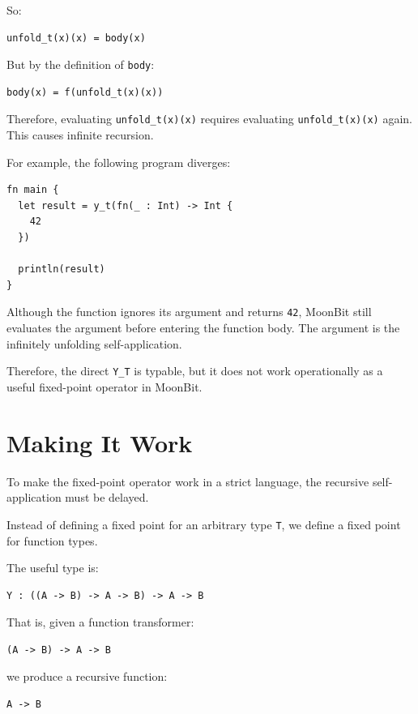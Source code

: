 \documentclass[manuscript]{acmart}
\begin{document}
So:

\begin{lstlisting}
unfold_t(x)(x) = body(x)
\end{lstlisting}

But by the definition of \texttt{body}:

\begin{lstlisting}
body(x) = f(unfold_t(x)(x))
\end{lstlisting}

Therefore, evaluating \texttt{unfold\_t(x)(x)} requires evaluating \texttt{unfold\_t(x)(x)} again. This causes infinite recursion.

For example, the following program diverges:

\begin{lstlisting}
fn main {
  let result = y_t(fn(_ : Int) -> Int {
    42
  })

  println(result)
}
\end{lstlisting}

Although the function ignores its argument and returns \texttt{42}, MoonBit still evaluates the argument before entering the function body. The argument is the infinitely unfolding self-application.

Therefore, the direct \texttt{Y\_T} is typable, but it does not work operationally as a useful fixed-point operator in MoonBit.

\section{Making It Work}

To make the fixed-point operator work in a strict language, the recursive self-application must be delayed.

Instead of defining a fixed point for an arbitrary type \texttt{T}, we define a fixed point for function types.

The useful type is:

\begin{lstlisting}
Y : ((A -> B) -> A -> B) -> A -> B
\end{lstlisting}

That is, given a function transformer:

\begin{lstlisting}
(A -> B) -> A -> B
\end{lstlisting}

we produce a recursive function:

\begin{lstlisting}
A -> B
\end{lstlisting}
\end{document}
